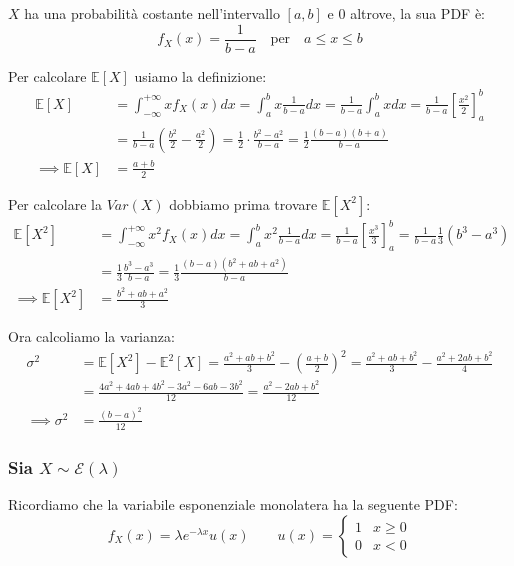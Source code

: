 $X$ ha una probabilità costante nell'intervallo $[a, b]$ e $0$ altrove, la sua PDF è:
\[ f_X(x) = \frac{1}{b-a} \quad \text{per} \quad a \le x \le b \]

Per calcolare $\mathbb{E}[X]$ usiamo la definizione:
\begin{align}
\mathbb{E}[X] &= \int_{-\infty}^{+\infty} x f_X(x) dx = \int_{a}^{b} x \frac{1}{b-a} dx = \frac{1}{b-a} \int_{a}^{b} x dx = \frac{1}{b-a} \left[ \frac{x^2}{2} \right]_{a}^{b} \nonumber \\
&= \frac{1}{b-a} \left( \frac{b^2}{2} - \frac{a^2}{2} \right) = \frac{1}{2} \cdot \frac{b^2 - a^2}{b-a} = \frac{1}{2} \frac{(b-a)(b+a)}{b-a} \nonumber \\
\implies \mathbb{E}[X] &= \frac{a+b}{2}
\end{align}

Per calcolare la $Var(X)$ dobbiamo prima trovare $\mathbb{E}[X^2]$:
\begin{align}
\mathbb{E}[X^2] &= \int_{-\infty}^{+\infty} x^2 f_X(x) dx = \int_{a}^{b} x^2 \frac{1}{b-a} dx = \frac{1}{b-a} \left[ \frac{x^3}{3} \right]_{a}^{b} = \frac{1}{b-a} \frac{1}{3} (b^3 - a^3) \nonumber \\
&= \frac{1}{3} \frac{b^3 - a^3}{b-a} = \frac{1}{3} \frac{(b-a)(b^2 + ab + a^2)}{b-a} \nonumber \\
\implies \mathbb{E}[X^2] &= \frac{b^2 + ab + a^2}{3}
\end{align}

Ora calcoliamo la varianza:
\begin{align}
\sigma^2 &= \mathbb{E}[X^2] - \mathbb{E}^2[X] = \frac{a^2 + ab + b^2}{3} - \left(\frac{a+b}{2}\right)^2 = \frac{a^2 + ab + b^2}{3} - \frac{a^2 + 2ab + b^2}{4} \nonumber \\
&= \frac{4a^2 + 4ab + 4b^2 - 3a^2 - 6ab - 3b^2}{12} = \frac{a^2 - 2ab + b^2}{12} \nonumber \\
\implies \sigma^2 &= \frac{(b-a)^2}{12}
\end{align}


\subsubsection{Sia $X \sim \mathcal{E}(\lambda)$}

Ricordiamo che la variabile esponenziale monolatera ha la seguente PDF:
\[ f_X(x) = \lambda e^{-\lambda x} u(x) \qquad u(x) = \begin{cases} 1 & x \ge 0 \\ 0 & x < 0 \end{cases} \]

